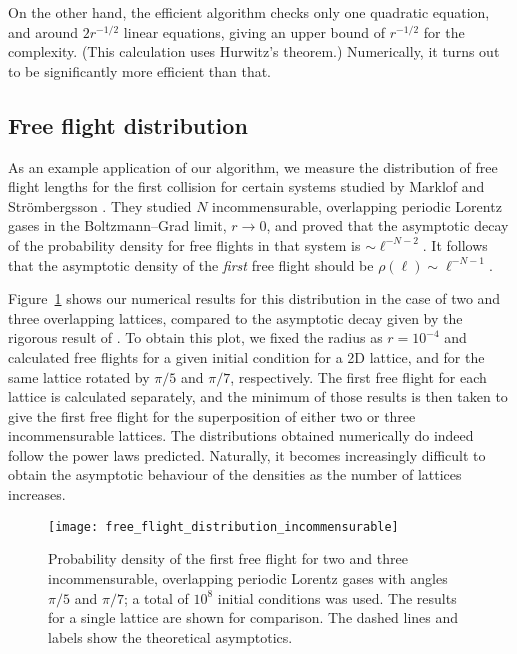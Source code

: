 \documentclass[pre,amsmath,amssymb, twocolumn, showpacs]{revtex4-1}
\begin{document}
On the other hand, the efficient algorithm checks only one quadratic equation, and around 
$2r^{-1/2}$ linear equations, giving an upper bound of $r^{-1/2}$ for the complexity. (This calculation uses Hurwitz's theorem.) Numerically, it turns out to be significantly more efficient than that. 


\subsection{Free flight distribution}
As an example application of our algorithm, we measure the distribution of free flight lengths for the first collision for certain systems studied by Marklof and Str\"ombergsson \cite{marklof2014power}. They studied $N$ incommensurable, overlapping periodic Lorentz gases in the Boltzmann--Grad limit, $r \to 0$, and proved that the asymptotic decay of the probability density for free flights in that system is $\sim \ell^{-N-2}$. It follows that the asymptotic density of the \emph{first} free flight should be 
$\rho(\ell) \sim \ell^{-N-1}$.

Figure~\ref{fig:free-flights} shows our numerical results for this distribution in the case of two and three overlapping lattices, compared to the asymptotic decay given by the rigorous result of \cite{marklof2014power}. 
To obtain this plot, we fixed the radius as $r=10^{-4}$ and calculated free flights for a given initial condition for a 2D lattice, and for the same lattice rotated by $\pi/5$ and $\pi/7$, respectively. The first free flight for each lattice is calculated separately, and the minimum of those results is then taken to give the first free flight for the superposition of either two or three incommensurable lattices. 
The distributions obtained numerically do indeed follow the power laws predicted.  Naturally, it becomes increasingly difficult to obtain the asymptotic behaviour of the densities as the number of lattices increases.

\begin{figure}
\centering
\texttt{[image: free\_flight\_distribution\_incommensurable]}%
\caption{Probability density of the first free flight for two and three incommensurable, overlapping periodic Lorentz gases with angles $\pi/5$ and $\pi/7$; a total of $10^{8}$ initial conditions was used. The results for a single lattice are shown for comparison. The dashed lines and labels show the theoretical asymptotics.}
\label{fig:free-flights}
\end{figure}
\end{document}

